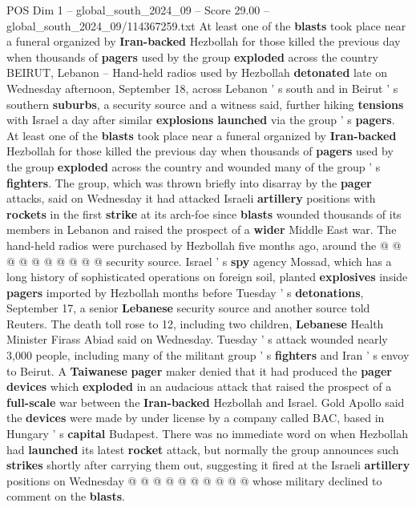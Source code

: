 \begin{textsample}{POS Dim 1 – global\_south\_2024\_09 – Score 29.00 – global\_south\_2024\_09/114367259.txt}  \label{ex:f1_pos_040}
At least one of the \textbf{blasts} took place near a funeral organized by \textbf{Iran-backed} Hezbollah for those killed the previous day when thousands of \textbf{pagers} used by the group \textbf{exploded} across the country BEIRUT, Lebanon -- Hand-held radios used by Hezbollah \textbf{detonated} late on Wednesday afternoon, September 18, across Lebanon ' s south and in Beirut ' s southern \textbf{suburbs}, a security source and a witness said, further hiking \textbf{tensions} with Israel a day after similar \textbf{explosions} \textbf{launched} via the group ' s \textbf{pagers}.
At least one of the \textbf{blasts} took place near a funeral organized by \textbf{Iran-backed} Hezbollah for those killed the previous day when thousands of \textbf{pagers} used by the group \textbf{exploded} across the country and wounded many of the group ' s \textbf{fighters}.
The group, which was thrown briefly into disarray by the \textbf{pager} attacks, said on Wednesday it had attacked Israeli \textbf{artillery} positions with \textbf{rockets} in the first \textbf{strike} at its arch-foe since \textbf{blasts} wounded thousands of its members in Lebanon and raised the prospect of a \textbf{wider} Middle East war.
The hand-held radios were purchased by Hezbollah five months ago, around the @ @ @ @ @ @ @ @ @ @ security source.
Israel ' s \textbf{spy} agency Mossad, which has a long history of sophisticated operations on foreign soil, planted \textbf{explosives} inside \textbf{pagers} imported by Hezbollah months before Tuesday ' s \textbf{detonations}, September 17, a senior \textbf{Lebanese} security source and another source told Reuters.
The death toll rose to 12, including two children, \textbf{Lebanese} Health Minister Firass Abiad said on Wednesday.
Tuesday ' s attack wounded nearly 3,000 people, including many of the militant group ' s \textbf{fighters} and Iran ' s envoy to Beirut.
A \textbf{Taiwanese} \textbf{pager} maker denied that it had produced the \textbf{pager} \textbf{devices} which \textbf{exploded} in an audacious attack that raised the prospect of a \textbf{full-scale} war between the \textbf{Iran-backed} Hezbollah and Israel.
Gold Apollo said the \textbf{devices} were made by under license by a company called BAC, based in Hungary ' s \textbf{capital} Budapest.
There was no immediate word on when Hezbollah had \textbf{launched} its latest \textbf{rocket} attack, but normally the group announces such \textbf{strikes} shortly after carrying them out, suggesting it fired at the Israeli \textbf{artillery} positions on Wednesday @ @ @ @ @ @ @ @ @ @ whose military declined to comment on the \textbf{blasts}.

\end{textsample}
